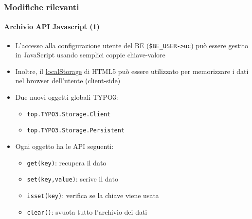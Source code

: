 
\begin{frame}[fragile]
	\frametitle{Modifiche rilevanti}
	\framesubtitle{Archivio API Javascript (1)}

	\begin{itemize}
		\item L'accesso alla configurazione utente del BE (\texttt{\$BE\_USER->uc}) può essere gestito
			in JavaScript usando semplici coppie chiave-valore
		\item Inoltre, il \href{http://www.w3.org/TR/webstorage/}{localStorage} di HTML5
			può essere utilizzato per memorizzare i dati nel browser dell'utente (client-side)

		\item Due nuovi oggetti globali TYPO3:
			\begin{itemize}
				\item \texttt{top.TYPO3.Storage.Client}
				\item \texttt{top.TYPO3.Storage.Persistent}
			\end{itemize}

		\item Ogni oggetto ha le API seguenti:
			\begin{itemize}
				\item \texttt{get(key)}: recupera il dato
				\item \texttt{set(key,value)}: scrive il dato
				\item \texttt{isset(key)}: verifica se la chiave viene usata
				\item \texttt{clear()}: svuota tutto l'archivio dei dati
			\end{itemize}

	\end{itemize}

\end{frame}


